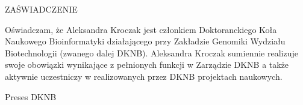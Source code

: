 \documentclass[12pt,firstpage,polish,a4paper]{letter}
\date{Wrocław, \today}
\newcommand{\memberName}{Aleksandra Kroczak }
\begin{document}
 
\begin{letter}{}{}
 
\begin{center}\opening{ZAŚWIADCZENIE}
\end{center}

Oświadczam, że \memberName jest członkiem Doktoranckiego Koła Naukowego Bioinformatyki działającego przy Zakładzie Genomiki Wydziału Biotechnologii (zwanego dalej DKNB). \memberName sumiennie realizuje swoje obowiązki wynikające z pełnionych funkcji w Zarządzie DKNB a także aktywnie uczestniczy w realizowanych przez DKNB projektach naukowych.

\vfill

\begin{flushright}Preses DKNB
\end{flushright}
\end{letter}
\end{document}
